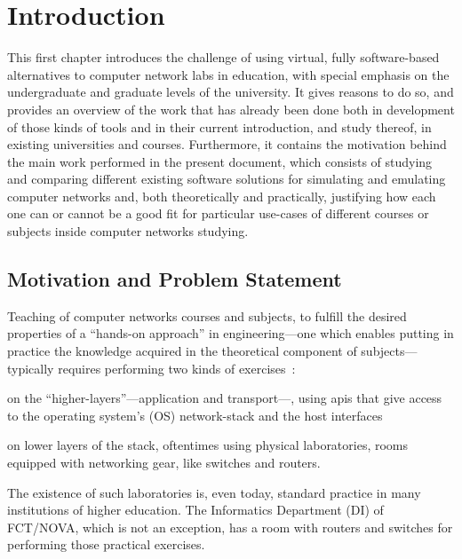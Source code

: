 
\chapter{Introduction}
\label{ch:introduction}

This first chapter introduces the challenge of using virtual, fully software-based alternatives to computer network labs in education, with special emphasis on the undergraduate and graduate levels of the university.
It gives reasons to do so, and provides an overview of the work that has already been done both in development of those kinds of tools and in their current introduction, and study thereof, in existing universities and courses.
Furthermore, it contains the motivation behind the main work performed in the present document, which consists of studying and comparing different existing software solutions for simulating and emulating computer networks and, both theoretically and practically, justifying how each one can or cannot be a good fit for particular use-cases of different courses or subjects inside computer networks studying.

\section{Motivation and Problem Statement}
\label{sec:motivation}

Teaching of computer networks courses and subjects, to fulfill the desired properties of a ``hands-on approach'' in engineering---one which enables putting in practice the knowledge acquired in the theoretical component of subjects---typically requires performing two kinds of exercises~\cite{problembasedlearning}:
  \begin{enumerate*}[label=(\roman*), itemjoin={{, }}, itemjoin*={{, and }}]
  \item on the ``higher-layers''---application and transport---, using \glspl{api} that give access to the operating system's (OS) network-stack and the host interfaces
  \item on lower layers of the stack, oftentimes using physical laboratories, rooms equipped with networking gear, like switches and routers.
  \end{enumerate*}
The existence of such laboratories is, even today, standard practice in many institutions of higher education.
The Informatics Department (DI) of FCT/NOVA, which is not an exception, has a room with routers and switches for performing those practical exercises.

